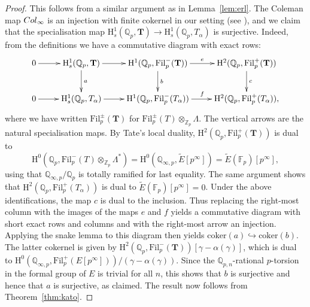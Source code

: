 \documentclass[10pt,reqno]{amsart}
\numberwithin{equation}{section}
\theoremstyle{plain}
\theoremstyle{definition}
\theoremstyle{definition}
\theoremstyle{plain}
\theoremstyle{plain}
\theoremstyle{plain}
\theoremstyle{plain}
\theoremstyle{plain}
\theoremstyle{plain}
\newcommand{\Fil}{\mathrm{Fil}}
\newcommand{\Z}{\mathbb{Z}}
\newcommand{\Q}{\mathbb{Q}}
\newcommand{\rH}{\mathrm{H}}
\begin{document}
\begin{proof} 
This follows from a similar argument as in Lemma~\ref{lem:erl}. The Coleman map ${\rm Col}_\infty$ is an injection with finite cokernel in our setting (see \cite[Prop.~17.11]{kato-euler-systems}), and we claim that the specialisation map $\rH^1_{s}(\Q_p,\mathbf{T})\rightarrow\rH^1_{s}(\Q_p,T_\alpha)$ is surjective. Indeed, from the definitions we have a commutative diagram with exact rows:
\[
\xymatrix{
0\ar[r] &\rH^1_s(\Q_p,\mathbf{T})\ar[r]\ar[d]^a& \rH^1(\Q_p,\Fil_p^-(\mathbf{T}))\ar[d]^b\ar[r]^e & \rH^2(\Q_p,\Fil_p^+(\mathbf{T}))\ar[d]^c \\
0\ar[r] & \rH^1_s(\Q_p,T_\alpha)\ar[r]& \rH^1(\Q_p,\Fil_p^-(T_\alpha))\ar[r]^f & \rH^2(\Q_p,\Fil_p^+(T_\alpha)),
}
\]
where we have written $\Fil_p^\pm(\mathbf{T})$ for $\Fil_p^\pm(T)\otimes_{\Z_p}\Lambda$.  The vertical arrows are the natural specialisation maps. 
By Tate's local duality, $\rH^2(\Q_p,\Fil_p^+(\mathbf{T}))$ is dual to 
\[
\rH^0(\Q_p,\Fil_p^- (T)\otimes_{\Z_p}\Lambda^*)=\rH^0(\Q_{\infty,p},\tilde{E}[p^\infty])=\tilde{E}(\mathbb{F}_p)[p^\infty],
\] 
using that $\mathbb{Q}_{\infty,p}/\mathbb{Q}_p$ is totally ramified for last equality. The same argument shows that $\rH^2(\mathbb{Q}_p,\Fil_p^+(T_\alpha))$ is dual to $\tilde{E}(\mathbb{F}_p)[p^\infty]=0$. Under the above identifications, the map $c$ is dual to the inclusion. Thus replacing the right-most column with the images of the maps $e$ and $f$ yields 
a commutative diagram with short exact rows and columns and with the right-most arrow an injection. Applying the snake lemma to this diagram then yields
$\mathrm{coker}(a)\hookrightarrow \mathrm{coker}(b)$. The latter cokernel is given by $\rH^2(\mathbb{Q}_p,\Fil_p^-(\mathbf{T}))[\gamma-\alpha(\gamma)]$, which is dual to $\rH^0(\mathbb{Q}_{\infty,p},\Fil_p^+(E[p^\infty]))/(\gamma-\alpha(\gamma))$. Since the $\mathbb{Q}_{p,n}$-rational $p$-torsion in the formal group of $E$ is trivial for all $n$, this shows that $b$ is surjective and hence that $a$ is surjective, as claimed. The result now follows from Theorem~\ref{thm:kato}.
%

\end{proof}
\end{document}

